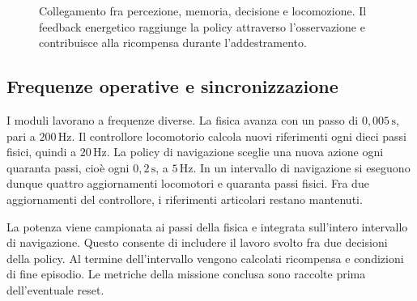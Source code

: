 \begin{figure}[tbp]
    \centering
    \caption[Architettura del sistema di navigazione]{Collegamento fra percezione, memoria, decisione e locomozione. Il feedback energetico raggiunge la policy attraverso l'osservazione e contribuisce alla ricompensa durante l'addestramento.}
    \label{fig:metodo-architettura}
\end{figure}

\subsection{Frequenze operative e sincronizzazione}

I moduli lavorano a frequenze diverse. La fisica avanza con un passo di $0{,}005\,\mathrm{s}$, pari a $200\,\mathrm{Hz}$. Il controllore locomotorio calcola nuovi riferimenti ogni dieci passi fisici, quindi a $20\,\mathrm{Hz}$. La policy di navigazione sceglie una nuova azione ogni quaranta passi, cioè ogni $0{,}2\,\mathrm{s}$, a $5\,\mathrm{Hz}$. In un intervallo di navigazione si eseguono dunque quattro aggiornamenti locomotori e quaranta passi fisici. Fra due aggiornamenti del controllore, i riferimenti articolari restano mantenuti.

La potenza viene campionata ai passi della fisica e integrata sull'intero intervallo di navigazione. Questo consente di includere il lavoro svolto fra due decisioni della policy. Al termine dell'intervallo vengono calcolati ricompensa e condizioni di fine episodio. Le metriche della missione conclusa sono raccolte prima dell'eventuale reset.

